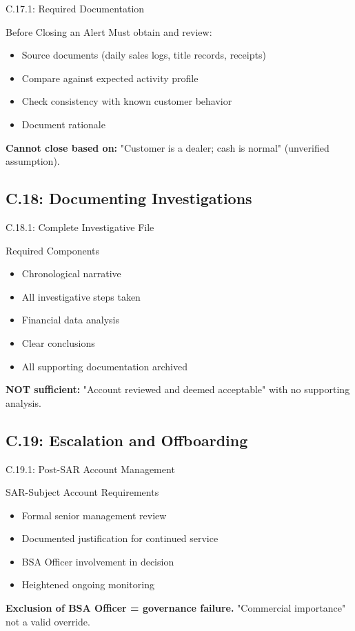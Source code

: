 \documentclass{beamer}
\begin{document}
		\begin{frame}{C.17.1: Required Documentation}
			\begin{block}{Before Closing an Alert}
				Must obtain and review:
				\begin{itemize}
					\item Source documents (daily sales logs, title records, receipts)
					\item Compare against expected activity profile
					\item Check consistency with known customer behavior
					\item Document rationale
				\end{itemize}
			\end{block}
			\textbf{Cannot close based on:} "Customer is a dealer; cash is normal" (unverified assumption).
		\end{frame}
		
		\subsection{C.18: Documenting Investigations}
		
		\begin{frame}{C.18.1: Complete Investigative File}
			\begin{block}{Required Components}
				\begin{itemize}
					\item Chronological narrative
					\item All investigative steps taken
					\item Financial data analysis
					\item Clear conclusions
					\item All supporting documentation archived
				\end{itemize}
			\end{block}
			\textbf{NOT sufficient:} "Account reviewed and deemed acceptable" with no supporting analysis.
		\end{frame}
		
		\subsection{C.19: Escalation and Offboarding}
		
		\begin{frame}{C.19.1: Post-SAR Account Management}
			\begin{block}{SAR-Subject Account Requirements}
				\begin{itemize}
					\item Formal senior management review
					\item Documented justification for continued service
					\item BSA Officer involvement in decision
					\item Heightened ongoing monitoring
				\end{itemize}
			\end{block}
			\textbf{ Exclusion of BSA Officer = governance failure.} "Commercial importance" not a valid override.
		\end{frame}
		
\end{document}
